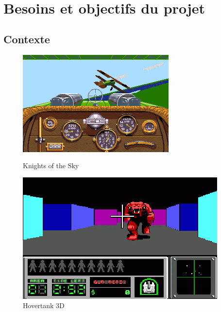 \documentclass[11pt]{article}
\begin{document}
\section{Besoins et objectifs du projet}
\subsection{Contexte}

\begin{figure}
	\begin{minipage}{0.48\textwidth}
		\includegraphics[width=\linewidth]{image/knights-of-the-sky.png}
		\hspace*{-0.5cm}
		\caption{Knights of the Sky}
		\label{fig:knights-of-the-sky}
	\end{minipage}
	\begin{minipage}{0.48\textwidth}
		\centering
		\includegraphics[width=\linewidth]{image/Hovertank_3D.png}
		\hspace*{-0.5cm}
		\caption{Hovertank 3D}
		\label{fig:hovertank3d}
	\end{minipage}
\end{figure}
\end{document}
